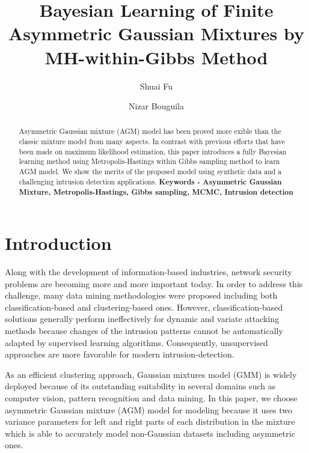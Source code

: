 \documentclass[conference]{llncs}
\begin{document}
\title{Bayesian Learning of Finite Asymmetric Gaussian Mixtures by MH-within-Gibbs Method}

\author{Shuai Fu \and Nizar Bouguila}



\maketitle

\begin{abstract}
Asymmetric Gaussian mixture (AGM) model has been proved more exible than the classic mixture model from many aspects. In contrast with previous efforts that have been made on maximum likelihood estimation, this paper introduces a fully Bayesian learning method using Metropolis-Hastings within Gibbs sampling method to learn AGM model. We show the merits of the proposed model using synthetic data and a challenging intrusion detection applications.
\bigbreak
\textbf{Keywords - Asymmetric Gaussian Mixture, Metropolis-Hastings, Gibbs sampling, MCMC, Intrusion detection}
\end{abstract}

\section{Introduction}
Along with the development of information-based industries, network security problems are becoming more and more important today. In order to address this challenge, many data mining methodologies were proposed including both classification-based \cite{b1} and clustering-based \cite{b2} ones. However, classification-based solutions generally perform ineffectively for dynamic and variate attacking methods because changes of the intrusion patterns cannot be automatically adapted by supervised learning algorithms. Consequently, unsupervised approaches are more favorable for modern intrusion-detection.

As an efficient clustering approach, Gaussian mixtures model (GMM) \cite{b3} is widely deployed because of its outstanding suitability in several domains such as computer vision, pattern recognition and data mining. In this paper, we choose asymmetric Gaussian mixture (AGM) model \cite{b4} for modeling because it uses two variance parameters for left and right parts of each distribution in the mixture which is able to accurately model non-Gaussian datasets including asymmetric ones. 
\end{document}
